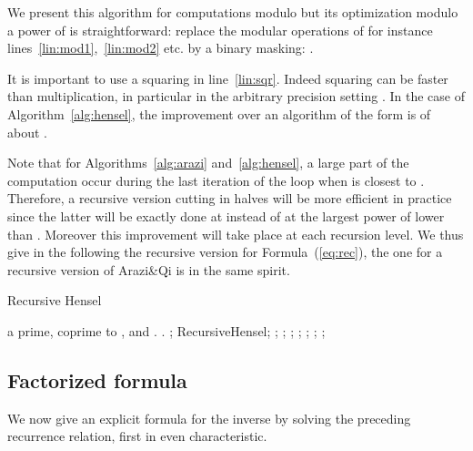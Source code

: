 \begin{remark} We present this algorithm for computations modulo  but its
optimization modulo a power of  is straightforward: replace the modular
operations of for instance lines~\ref{lin:mod1},~\ref{lin:mod2} etc. by a
binary masking: . 
\end{remark}

\begin{remark} It is important to use a squaring in line~\ref{lin:sqr}.
Indeed squaring can be faster than multiplication, in particular in the
arbitrary precision setting \cite{Zuras:1994:square}. 
In the case of Algorithm~\ref{alg:hensel}, the improvement over an algorithm of the
form  is of about .
\end{remark}

\begin{remark}
Note that for Algorithms~\ref{alg:arazi} and~\ref{alg:hensel}, a large part of
the computation occur during the last iteration of the loop when  is
closest to . Therefore, a recursive version cutting in halves will be more
efficient in practice since the latter will be exactly done at 
instead of at the largest power of  lower than . Moreover this
improvement will take place at each recursion level. 
We thus give in the following the recursive version for Formula~(\ref{eq:rec}),
the one for a recursive version of Arazi\&Qi is in the same spirit. 

\begin{algorithm}[htbp]
\setcounter{prevalgorithm}{\thealgorithm}
\renewcommand\thealgorithm{\theprevalgorithm'}
\addtocounter{algorithm}{-1}
\caption{Recursive Hensel}
\label{alg:rec}
\begin{algorithmic}[1]
\REQUIRE  a prime,  coprime to , and .
\ENSURE .
\IFTHEN{}{\algorithmicreturn~;}\hfill{}
\STATE 
\STATE\label{lin:modph} ;\hfill\COMMENT{}
\STATE RecursiveHensel;
\STATE ;\hfill\COMMENT{} 
\STATE ;\hfill\COMMENT{} 
\STATE\label{lin:modpm} ;\hfill\COMMENT{}
\STATE ;\hfill\COMMENT{}
\STATE ;\hfill\COMMENT{}
\STATE ;\hfill\COMMENT{}
\RETURN ;
\end{algorithmic}
\end{algorithm}
\end{remark}

\subsection{Factorized formula}
We now give an explicit formula for the inverse by solving the
preceding recurrence relation, first in even characteristic.\\

